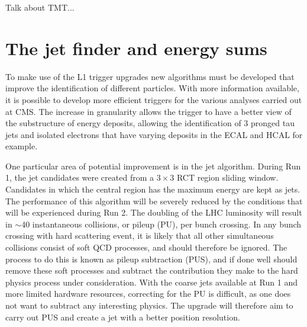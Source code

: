 Talk about TMT...

\section{The jet finder and energy sums}
\label{sec:jetFinder}

To make use of the L1 trigger upgrades new algorithms must be
developed that improve the identification of different particles. With
more information available, it is possible to develop more efficient
triggers for the various analyses carried out at CMS. The increase in
granularity allows the trigger to have a better view of the
substructure of energy deposits, allowing the identification of 3
pronged tau jets and isolated electrons that have varying deposits in
the ECAL and HCAL for example. 

One particular area of potential improvement is in the jet algorithm.
During Run 1, the jet candidates were created from a $3\times3$ RCT
region sliding window. Candidates in which the central region has the
maximum energy are kept as jets. The performance of this algorithm
will be severely reduced by the conditions that will be experienced
during Run 2. The doubling of the LHC luminosity will result in
$\sim$40 instantaneous collisions, or pileup (PU), per bunch crossing.
In any bunch crossing with hard scattering event, it is likely that
all other simultaneous collisions consist of soft QCD processes, and
should therefore be ignored. The process to do this is known as pileup
subtraction (PUS), and if done well should remove these soft processes
and subtract the contribution they make to the hard physics process
under consideration. With the coarse jets available at Run 1 and more
limited hardware resources, correcting for the PU is difficult, as one
does not want to subtract any interesting physics. The upgrade will
therefore aim to carry out PUS and create a jet with a better position
resolution.

